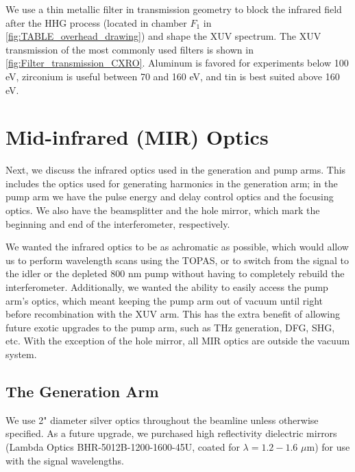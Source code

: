 We use a thin metallic filter in transmission geometry to block the infrared field after the HHG process (located in chamber $F_1$ in \cref{fig:TABLE_overhead_drawing}) and shape the XUV spectrum. The XUV transmission of the most commonly used filters is shown in \cref{fig:Filter_transmission_CXRO}. Aluminum is favored for experiments below 100 eV, zirconium is useful between 70 and 160 eV, and tin is best suited above 160 eV. 

\section{Mid-infrared (MIR) Optics}
Next, we discuss the infrared optics used in the generation and pump arms. This includes the optics used for generating harmonics in the generation arm; in the pump arm we have the pulse energy and delay control optics and the focusing optics. We also have the beamsplitter and the hole mirror, which mark the beginning and end of the interferometer, respectively.

We wanted the infrared optics to be as achromatic as possible, which would allow us to perform wavelength scans using the TOPAS, or to switch from the signal to the idler or the depleted 800 nm pump without having to completely rebuild the interferometer. Additionally, we wanted the ability to easily access the pump arm's optics, which meant keeping the pump arm out of vacuum until right before recombination with the XUV arm. This has the extra benefit of allowing future exotic upgrades to the pump arm, such as THz generation, DFG, SHG, etc. With the exception of the hole mirror, all MIR optics are outside the vacuum system. 

\subsection{The Generation Arm}

We use 2" diameter silver optics throughout the beamline unless otherwise specified. As a future upgrade, we purchased high reflectivity dielectric mirrors (Lambda Optics BHR-5012B-1200-1600-45U, coated for $\lambda = 1.2 - 1.6$ $\mu$m) for use with the signal wavelengths.

